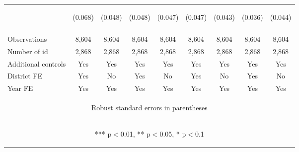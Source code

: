 \begin{center}
\begin{tabular}{lcccccccc}
 & \begin{footnotesize}(0.068)\end{footnotesize} & \begin{footnotesize}(0.048)\end{footnotesize} & \begin{footnotesize}(0.048)\end{footnotesize} & \begin{footnotesize}(0.047)\end{footnotesize} & \begin{footnotesize}(0.047)\end{footnotesize} & \begin{footnotesize}(0.043)\end{footnotesize} & \begin{footnotesize}(0.036)\end{footnotesize} & \begin{footnotesize}(0.044)\end{footnotesize} \\
\vspace{4pt} & \begin{footnotesize}\end{footnotesize} & \begin{footnotesize}\end{footnotesize} & \begin{footnotesize}\end{footnotesize} & \begin{footnotesize}\end{footnotesize} & \begin{footnotesize}\end{footnotesize} & \begin{footnotesize}\end{footnotesize} & \begin{footnotesize}\end{footnotesize} & \begin{footnotesize}\end{footnotesize} \\
Observations & 8,604 & 8,604 & 8,604 & 8,604 & 8,604 & 8,604 & 8,604 & 8,604 \\
Number of id & 2,868 & 2,868 & 2,868 & 2,868 & 2,868 & 2,868 & 2,868 & 2,868 \\
Additional controls & Yes & Yes & Yes & Yes & Yes & Yes & Yes & Yes \\
District FE & Yes & No & Yes & No & Yes & No & Yes & No \\
 Year FE & Yes & Yes & Yes & Yes & Yes & Yes & Yes & Yes \\ \hline
\multicolumn{9}{c}{\begin{footnotesize} Robust standard errors in parentheses\end{footnotesize}} \\
\multicolumn{9}{c}{\begin{footnotesize} *** p$<$0.01, ** p$<$0.05, * p$<$0.1\end{footnotesize}} \\
\end{tabular}
\end{center}
